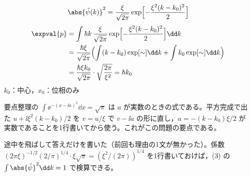 \[ \abs{\tilde{\psi}(k)}^{2}=\frac{\xi}{\sqrt{2\pi}}\exp\Bigl[-\frac{\xi^{2}(k-k_{0})^{2}}{2}\Bigr] \]
\begin{align*}
\expval{p}&=\int\hbar k\,\frac{\xi}{\sqrt{2\pi}}\exp\Bigl[-\frac{\xi^{2}(k-k_{0})^{2}}{2}\Bigr]\dd k\\
&=\frac{\hbar\xi}{\sqrt{2\pi}}\Bigl(\int(k-k_{0})\exp[\sim]\dd k+\int k_{0}\exp[\sim]\dd k\Bigr)\\
&=\frac{\hbar\xi k_{0}}{\sqrt{2\pi}}\cdot\sqrt{\frac{2\pi}{\xi^{2}}}=\hbar k_{0}
\end{align*}
$k_{0}$：中心，$x_{0}$：位相のみ
\item 要点整理の $\int\ee^{-(x-\ii a)^{2}}\dd x=\sqrt{\pi}$ は $a$ が実数のときの式である。平方完成で出た $u+\ii\xi^{2}(k-k_{0})/2$ を $v=u/\xi$ で $v-\ii a$ の形に直し，$a=-(k-k_{0})\xi/2$ が実数であることを1行書いてから使う。これがこの問題の要点である。
\item {} 途中を飛ばして答えだけを書いた（前回も理由の1文が無かった）。係数 $(2\pi\xi)^{-1/2}(2/\pi)^{1/4}\cdot\xi\sqrt{\pi}=(\xi^{2}/(2\pi))^{1/4}$ を1行書いておけば，(3) の $\int\abs{\tilde{\psi}}^{2}\dd k=1$ で検算できる。
